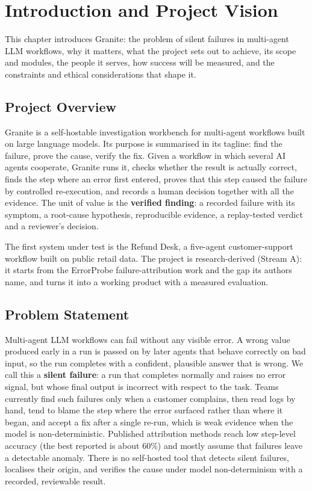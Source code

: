 \chapter{Introduction and Project Vision}

This chapter introduces Granite: the problem of silent failures in multi-agent LLM workflows, why it matters, what the project sets out to achieve, its scope and modules, the people it serves, how success will be measured, and the constraints and ethical considerations that shape it.

\section{Project Overview}

Granite is a self-hostable investigation workbench for multi-agent workflows built on large language models. Its purpose is summarised in its tagline: find the failure, prove the cause, verify the fix. Given a workflow in which several AI agents cooperate, Granite runs it, checks whether the result is actually correct, finds the step where an error first entered, proves that this step caused the failure by controlled re-execution, and records a human decision together with all the evidence. The unit of value is the \textbf{verified finding}: a recorded failure with its symptom, a root-cause hypothesis, reproducible evidence, a replay-tested verdict and a reviewer's decision.

The first system under test is the Refund Desk, a five-agent customer-support workflow built on public retail data. The project is research-derived (Stream A): it starts from the ErrorProbe failure-attribution work and the gap its authors name, and turns it into a working product with a measured evaluation.

\section{Problem Statement}

Multi-agent LLM workflows can fail without any visible error. A wrong value produced early in a run is passed on by later agents that behave correctly on bad input, so the run completes with a confident, plausible answer that is wrong. We call this a \textbf{silent failure}: a run that completes normally and raises no error signal, but whose final output is incorrect with respect to the task. Teams currently find such failures only when a customer complains, then read logs by hand, tend to blame the step where the error surfaced rather than where it began, and accept a fix after a single re-run, which is weak evidence when the model is non-deterministic. Published attribution methods reach low step-level accuracy (the best reported is about 60\%) and mostly assume that failures leave a detectable anomaly. There is no self-hosted tool that detects silent failures, localises their origin, and verifies the cause under model non-determinism with a recorded, reviewable result.

